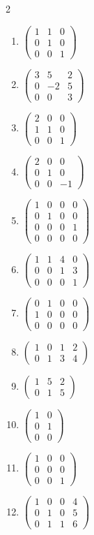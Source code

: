 \documentclass[12pt]{article}
\theoremstyle{remark}
\begin{document}
\begin{multicols}{2}
\begin{enumerate}[label=\textbf{\arabic*.},start=28,leftmargin=*]
\item $\begin{pmatrix}1&1&0\\0&1&0\\0&0&1\end{pmatrix}$
\item $\begin{pmatrix}3&5&2\\0&-2&5\\0&0&3\end{pmatrix}$
\item $\begin{pmatrix}2&0&0\\1&1&0\\0&0&1\end{pmatrix}$
\item $\begin{pmatrix}2&0&0\\0&1&0\\0&0&-1\end{pmatrix}$
\item $\begin{pmatrix}1&0&0&0\\0&1&0&0\\0&0&0&1\\0&0&0&0\end{pmatrix}$
\item $\begin{pmatrix}1&1&4&0\\0&0&1&3\\0&0&0&1\end{pmatrix}$
\item $\begin{pmatrix}0&1&0&0\\1&0&0&0\\0&0&0&0\end{pmatrix}$
\item $\begin{pmatrix}1&0&1&2\\0&1&3&4\end{pmatrix}$
\item $\begin{pmatrix}1&5&2\\0&1&5\end{pmatrix}$
\item $\begin{pmatrix}1&0\\0&1\\0&0\end{pmatrix}$
\item $\begin{pmatrix}1&0&0\\0&0&0\\0&0&1\end{pmatrix}$
\item $\begin{pmatrix}1&0&0&4\\0&1&0&5\\0&1&1&6\end{pmatrix}$
\end{enumerate}
\end{multicols}
\end{document}
